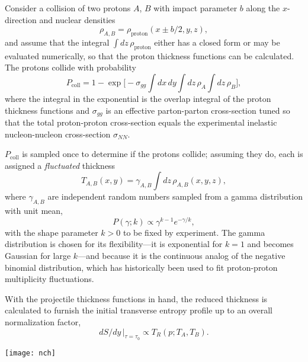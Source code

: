 \documentclass[aps,prc,reprint,amsmath,nofootinbib]{revtex4-1}
\newcommand{\trento}{T\raisebox{-.5ex}{R}ENTo}
\begin{document}
Consider a collision of two protons $A$, $B$ with impact parameter $b$ along the $x$-direction and nuclear densities
\begin{equation}
  \rho_{A,B} = \rho_\text{proton}(x \pm b/2, y, z),
\end{equation}
and assume that the integral $\int dz \, \rho_\text{proton}$ either has a closed form or may be evaluated numerically, so that the proton thickness functions can be calculated.
The protons collide with probability \cite{dEnterria:2010hd}
\begin{equation}
  P_\text{coll} = 1 - \exp\biggl[ -\sigma_{gg} \int dx \, dy \int dz \, \rho_A \int dz \, \rho_B \biggr],
  \label{eq:pcoll}
\end{equation}
where the integral in the exponential is the overlap integral of the proton thickness functions and
$\sigma_{gg}$ is an effective parton-parton cross-section tuned so that the total proton-proton
cross-section equals the experimental inelastic nucleon-nucleon cross-section $\sigma_{NN}$.

$P_\text{coll}$ is sampled once to determine if the protons collide; assuming they do, each is assigned a \emph{fluctuated} thickness
\begin{equation}
  T_{A,B}(x, y) = \gamma_{A,B} \int dz \, \rho_{A,B}(x, y, z),
\end{equation}
where $\gamma_{A,B}$ are independent random numbers sampled from a gamma distribution with unit mean,
\begin{equation}
  P(\gamma; k) \propto \gamma^{k-1} e^{-\gamma/k},
  \label{eq:gamma}
\end{equation}
with the shape parameter $k > 0$ to be fixed by experiment.  The gamma distribution is chosen for its
flexibility---it is exponential for $k = 1$ and becomes Gaussian for large $k$---and because it is the
continuous analog of the negative binomial distribution, which has historically been used to fit proton-proton
multiplicity fluctuations.

With the projectile thickness functions in hand, the reduced thickness is calculated to furnish the initial transverse entropy profile up to an overall normalization factor,
\begin{equation}
dS/dy \, |_{\tau = \tau_0} \propto T_R(p; T_A, T_B).
\end{equation}

\begin{figure*}[t]
  \texttt{[image: nch]}
  \caption{
    \label{fig:nch}
    Multiplicity distributions for proton-proton, proton-lead, and lead-lead collisions.
    The histograms are \protect\trento\ results for reduced thickness parameter $p = -1$ (top, orange), $p = 0$ (middle, blue), and $p = 1$ (bottom, green), with approximate best-fit fluctuation parameters $k$ and normalizations given in table~\ref{tab:nch}.
    The shaded bands show the sensitivity from varying $k$ by $\pm30\%$.
    Data points (triangles, squares, circles) are experimental distributions from ALICE \cite{Aamodt:2010ft,Abelev:2014mda} offset by powers of ten for comparison with the model.
  }
\end{figure*}
\end{document}
